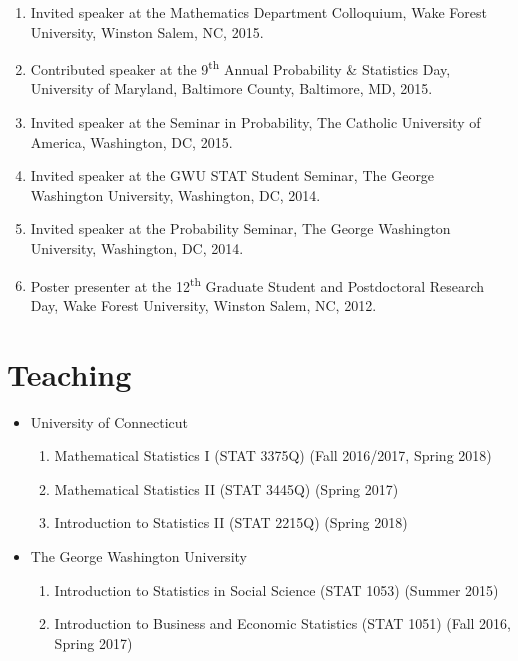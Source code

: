 \documentclass{res}
\begin{document}
\begin{resume}
\begin{enumerate}
	\item Invited speaker at the Mathematics Department Colloquium, Wake Forest University, Winston Salem, NC, 2015. 
	\item Contributed speaker at the 9\textsuperscript{th} Annual Probability \& Statistics Day, University of Maryland, Baltimore County, Baltimore, MD, 2015.
	\item Invited speaker at the Seminar in Probability, The Catholic University of America, Washington, DC, 2015.
	\item Invited speaker at the GWU STAT Student Seminar, The George Washington University, Washington, DC, 2014.
	\item Invited speaker at the Probability Seminar, The George Washington University, Washington, DC, 2014.
	\item Poster presenter at the 12\textsuperscript{th} Graduate Student and Postdoctoral Research Day, Wake Forest University, Winston Salem, NC, 2012.
\end{enumerate}

\section{Teaching}
\begin{itemize}
	\item University of Connecticut
	\begin{enumerate}
		\item Mathematical Statistics {\rm I} (STAT 3375Q) (Fall 
		2016/2017, Spring 2018)
		\item Mathematical Statistics {\rm II} (STAT 3445Q) (Spring 
		2017)
		\item Introduction to Statistics {\rm II} (STAT 2215Q) 
		(Spring 2018)
	\end{enumerate}
	\item The George Washington University
	\begin{enumerate}
		\item Introduction to Statistics in Social Science (STAT 
		1053) (Summer 2015)
		\item Introduction to Business and Economic Statistics 
		(STAT 1051) (Fall 2016, Spring 2017)
	\end{enumerate}
\end{itemize}


\end{resume}
\end{document}
